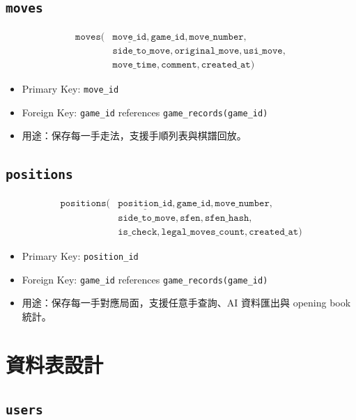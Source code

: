 \documentclass[12pt,a4paper,fontset=none]{ctexart}
\begin{document}
\subsection{\texttt{moves}}

\[
\begin{aligned}
\texttt{moves}(
&\underline{\texttt{move\_id}},
\texttt{game\_id},
\texttt{move\_number},\\
&\texttt{side\_to\_move},
\texttt{original\_move},
\texttt{usi\_move},\\
&\texttt{move\_time},
\texttt{comment},
\texttt{created\_at})
\end{aligned}
\]

\begin{itemize}
  \item Primary Key: \texttt{move\_id}
  \item Foreign Key: \texttt{game\_id} references \texttt{game\_records(game\_id)}
  \item 用途：保存每一手走法，支援手順列表與棋譜回放。
\end{itemize}

\subsection{\texttt{positions}}

\[
\begin{aligned}
\texttt{positions}(
&\underline{\texttt{position\_id}},
\texttt{game\_id},
\texttt{move\_number},\\
&\texttt{side\_to\_move},
\texttt{sfen},
\texttt{sfen\_hash},\\
&\texttt{is\_check},
\texttt{legal\_moves\_count},
\texttt{created\_at})
\end{aligned}
\]

\begin{itemize}
  \item Primary Key: \texttt{position\_id}
  \item Foreign Key: \texttt{game\_id} references \texttt{game\_records(game\_id)}
  \item 用途：保存每一手對應局面，支援任意手查詢、AI 資料匯出與 opening book 統計。
\end{itemize}

\section{資料表設計}

\subsection{\texttt{users}}
\end{document}

